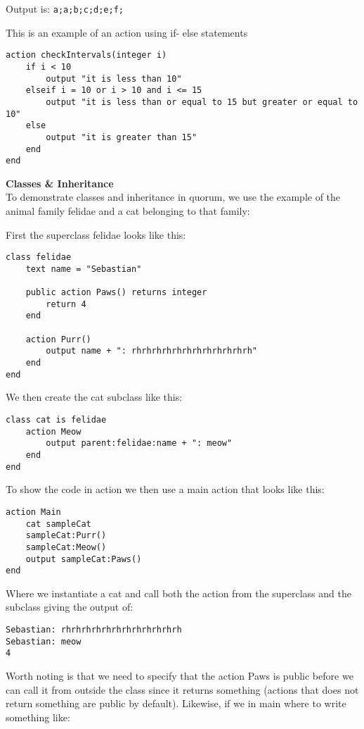 Output is:
\lstinline!a;a;b;c;d;e;f;!

This is an example of an action using if- else statements

\begin{lstlisting}[language=Quorum]
action checkIntervals(integer i)
    if i < 10
        output "it is less than 10"
    elseif i = 10 or i > 10 and i <= 15
        output "it is less than or equal to 15 but greater or equal to 10"
    else
        output "it is greater than 15"
    end
end
\end{lstlisting}

\textbf{Classes \& Inheritance}\\
To demonstrate classes and inheritance in quorum, we use the example of the animal family felidae and a cat belonging to that family:

First the superclass felidae looks like this:

\begin{lstlisting}[language=Quorum]
class felidae 
    text name = "Sebastian"

    public action Paws() returns integer
        return 4
    end

    action Purr()
        output name + ": rhrhrhrhrhrhrhrhrhrhrhrh"
    end
end
\end{lstlisting}

We then create the cat subclass like this:

\begin{lstlisting}[language=Quorum]
class cat is felidae
    action Meow
        output parent:felidae:name + ": meow"
    end
end
\end{lstlisting}

To show the code in action we then use a main action that looks like this:

\begin{lstlisting}[language=Quorum]
action Main
    cat sampleCat
    sampleCat:Purr()
    sampleCat:Meow()
    output sampleCat:Paws()
end
\end{lstlisting}

Where we instantiate a cat and call both the action from the superclass and the subclass giving the output of: 

\lstinline!Sebastian: rhrhrhrhrhrhrhrhrhrhrhrh!\\
\lstinline!Sebastian: meow!\\
\lstinline!4!

Worth noting is that we need to specify that the action Paws is public before we can call it from outside the class since it returns something (actions that does not return something are public by default). Likewise, if we in main where to write something like:

